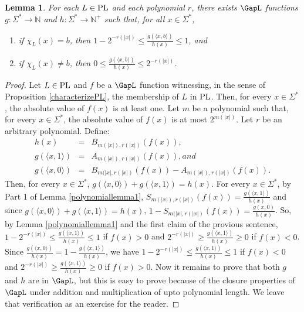 \documentclass{amsbook}
\newtheorem{lemma}[theorem]{Lemma}
\theoremstyle{definition}
\theoremstyle{remark}
\numberwithin{section}{chapter}
\numberwithin{equation}{chapter}
\renewcommand{\PL}{\mbox{\rm PL}}
\newcommand{\N}{\mathbb{N}}
\begin{document}
\begin{lemma}\label{polynomiallemma2}
For each $L\in\PL$ and each polynomial $r$, there exists $\GapL$ functions $g:\Sigma^*\rightarrow \N$ and $h:\Sigma^*\rightarrow\N^+$ such that, for all $x\in\Sigma^*$,
\begin{enumerate}
\item if $\chi_L(x)=b$, then $1-2^{-r(|x|)}\leq \frac{g(\langle x,b\rangle )}{h(x)}\leq 1$, and
\item if $\chi_L(x)\neq b$, then $0\leq \frac{g(\langle x,b\rangle )}{h(x)}\leq 2^{-r(|x|)}$.
\end{enumerate} 
\end{lemma}
\begin{proof}
Let $L\in\PL$ and $f$ be a $\GapL$ function witnessing, in the sense of Proposition \ref{characterizePL}, the membership of $L$ in $\PL$. Then, for every $x\in\Sigma^*$, the absolute value of $f(x)$ is at least one. Let $m$ be a polynomial such that, for every $x\in\Sigma^*$, the absolute value of $f(x)$ is at most $2^{m(|x|)}$. Let $r$ be an arbitrary polynomial. Define:
\begin{eqnarray*}
h(x) & = & B_{m(|x|),r(|x|)}(f(x)),\\
g(\langle x,1\rangle ) & = & A_{m(|x|),r(|x|)}(f(x)), and\\
g(\langle x,0\rangle ) & = & B_{m(|x|,r(|x|)}(f(x))-A_{m(|x|),r(|x|)}(f(x)).
\end{eqnarray*}
Then, for every $x\in\Sigma^*$, $g(\langle x,0\rangle )+g(\langle x,1\rangle )=h(x)$. For every $x\in\Sigma^*$, by Part 1 of Lemma \ref{polynomiallemma1}, $S_{m(|x|),r(|x|)}(f(x))=\frac{g(\langle x,1\rangle )}{h(x)}$ and since $g(\langle x,0\rangle )+g(\langle x,1\rangle )=h(x)$, $1-S_{m(|x|,r(|x|)}(f(x))=\frac{g(x,0)}{h(x)}$. So, by Lemma \ref{polynomiallemma1} and the first claim of the provious sentence, $1-2^{-r(|x|)}\leq \frac{g(\langle x,1\rangle )}{h(x)}\leq 1$ if $f(x)>0$ and $2^{-r(|x|)}\geq \frac{g(\langle x,1\rangle )}{h(x)}\geq 0$ if $f(x)<0$. Since $\frac{g(\langle x,0\rangle )}{h(x)}=1-\frac{g(\langle x,1\rangle )}{h(x)}$, we have $1-2^{-r(|x|)}\leq \frac{g(\langle x,1\rangle )}{h(x)}\leq 1$ if $f(x)<0$ and $2^{-r(|x|)}\geq \frac{g(\langle x,1\rangle )}{h(x)}\geq 0$ if $f(x)>0$. Now it remains to prove that both $g$ and $h$ are in $\GapL$, but this is easy to prove because of the closure properties of $\GapL$ under addition and multiplication of upto polynomial length. We leave that verification as an exercise for the reader.
\end{proof}
\end{document}
